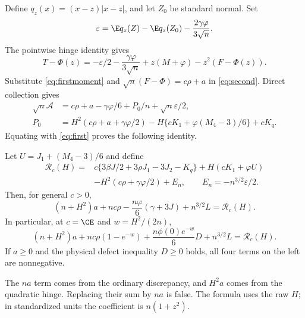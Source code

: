 Define $q_z(x)=(x-z)|x-z|$, and let $Z_0$ be standard normal. Set
\[
 \varepsilon=\E q_z(Z)-\E q_z(Z_0)-\frac{2\gamma\varphi}{3\sqrt n}.
\]
The pointwise hinge identity gives
\[
 T-\Phi(z)=-\varepsilon/2-\frac{\gamma\varphi}{3\sqrt n}
                     +z(M+\varphi)-z^2(F-\Phi(z)).
\]
Substitute \eqref{eq:firstmoment} and
$\sqrt n(F-\Phi)=c\rho+a$ in \eqref{eq:second}. Direct collection gives
\begin{align*}
 \sqrt n\mathcal A&=c\rho+a-\gamma\varphi/6+P_0/n
                                          +\sqrt n\varepsilon/2,\\
 P_0&=H^2(c\rho+a+\gamma\varphi/2)
       -H\{cK_1+\varphi(M_4-3)/6\}+cK_q.
\end{align*}
Equating with \eqref{eq:first} proves the following identity.

\begin{theorem}\label{thm:identity}
Let $U=J_1+(M_4-3)/6$ and define
\begin{align*}
 \mathscr R_c(H)={}&c\{3\beta J/2+3\rho J_1-3J_2-K_q\}
    +H(cK_1+\varphi U)\\
 &-H^2(c\rho+\gamma\varphi/2)+E_n,
 \qquad E_n=-n^{3/2}\varepsilon/2.
\end{align*}
Then, for general $c>0$,
\begin{equation}\label{eq:general}
 (n+H^2)a+nc\rho-\frac{n\varphi}{6}(\gamma+3J)+n^{3/2}L
 =\mathscr R_c(H).
\end{equation}
In particular, at $c=\CE$ and $w=H^2/(2n)$,
\begin{equation}\label{eq:conserved}
 \boxed{(n+H^2)a+nc\rho(1-e^{-w})
   +\frac{n\phi(0)e^{-w}}6D+n^{3/2}L=\mathscr R_c(H).}
\end{equation}
If $a\ge0$ and the physical defect inequality $D\ge0$ holds, all four
terms on the left are nonnegative.
\end{theorem}
The $na$ term comes from the ordinary discrepancy, and $H^2a$ comes from
the quadratic hinge. Replacing their sum by $na$ is false. The formula
uses the raw $H$; in standardized units the coefficient is $n(1+z^2)$.

